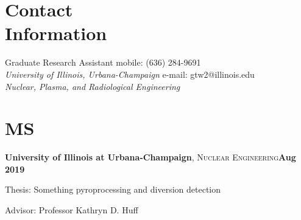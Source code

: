\documentclass[margin,line]{resume}
\begin{document}
\begin{resume}

    \section{\mysidestyle Contact\\Information}
    Graduate Research Assistant \hfill mobile: (636) 284-9691 \vspace{0mm}\\\vspace{0mm}%
        \textsl{University of Illinois, Urbana-Champaign}
        \hfill e-mail: gtw2@illinois.edu           \vspace{0mm}\\\vspace{0mm}%
    \textsl{Nuclear, Plasma, and Radiological Engineering}
        \vspace{0mm}\\\vspace{0mm}%

    \section{\mysidestyle MS}
    \textbf{University of Illinois at Urbana-Champaign}, \textsc{Nuclear Engineering}\hfill \textbf{Aug 2019}\vspace{-3mm}\\\vspace{-1mm}%
    \begin{list2}
        \item Thesis: Something pyroprocessing and diversion detection
        \item Advisor:  Professor Kathryn D. Huff
    \end{list2}\vspace{-1.5mm}

\end{resume}
\end{document}
